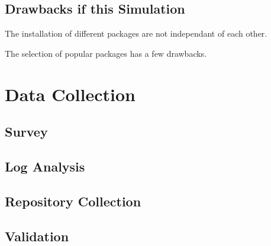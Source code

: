 \subsection{Drawbacks if this Simulation}
The installation of different packages are not independant of each other.

The selection of popular packages has a few drawbacks.

\section{Data Collection}

\subsection{Survey}

\subsection{Log Analysis}

\subsection{Repository Collection}


\subsection{Validation}

